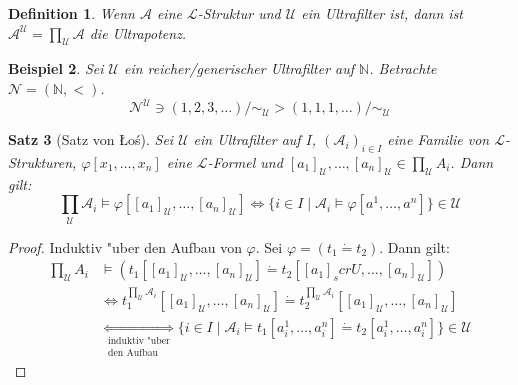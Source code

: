 \documentclass[a4paper,12pt,numbers=noenddot,parskip=full]{scrartcl}
\newcommand{\setN}{\mathbb{N}}
\newcommand{\scrL}{\mathcal{L}}
\newcommand{\scrA}{\mathcal{A}}
\newcommand{\scrU}{\mathcal{U}}
\theoremstyle{dotless}
\newtheorem{theorem}{Satz}[section]
\newtheorem{definition}[theorem]{Definition}
\newtheorem{example}[theorem]{Beispiel}
\theoremstyle{remark}
\begin{document}
	\begin{definition}
		Wenn $\scrA$ eine $\scrL$-Struktur und $\scrU$ ein Ultrafilter ist, dann ist $\scrA^\scrU = \prod\limits_{\scrU} \scrA$ die Ultrapotenz.
	\end{definition}

	\begin{example}
		Sei $\scrU$ ein reicher/generischer Ultrafilter auf $\setN$. Betrachte $\mathcal{N} = (\setN, <)$.
		\begin{equation*}
			\mathcal{N}^\scrU \ni {(1,2,3, \dots)/\sim_\scrU} > {(1,1,1, \dots)/ \sim_\scrU}
		\end{equation*}
	\end{example}

\begin{theorem}[Satz von Łoś]\label{los:thm}
	Sei $\scrU$ ein Ultrafilter auf $I$, $(\scrA_i)_{i \in I}$ eine Familie von $\scrL$-Strukturen, $\varphi[x_1, \dots, x_n]$ eine $\scrL$-Formel und $[a_1]_\scrU , \dots, [a_n]_\scrU \in \prod\limits_{\scrU} A_i$. Dann gilt:
	\begin{equation*}
		\prod\limits_{\scrU} \scrA_i \models \varphi[[a_1]_\scrU , \dots , [a_n]_\scrU] \Longleftrightarrow \{i \in I \mid \scrA_i \models \varphi[a^1, \dots, a^n] \} \in \scrU
	\end{equation*}
\end{theorem}
\begin{proof}
	Induktiv "uber den Aufbau von $\varphi$. Sei $\varphi = (t_1 \dot= t_2)$. Dann gilt:
	\begin{align*}
		\prod\limits_{\scrU} A_i &\models (t_1[[a_1]_\scrU , \dots, [a_n]_\scrU] \dot= t_2[[a_1]_scrU, \dots, [a_n]_\scrU])\\
		&\Leftrightarrow t_1^{\prod\limits_{\scrU} \scrA_i}[[a_1]_\scrU , \dots, [a_n]_\scrU] \dot= t_2^{\prod\limits_{\scrU} \scrA_i}[[a_1]_\scrU, \dots, [a_n]_\scrU]\\
		&\underset{\substack{\text{induktiv "uber}\\ \text{den Aufbau}}}{\Leftrightarrow} \{i \in I \mid \scrA_i \models t_1[a_i^1, \dots, a_i^n]\dot= t_2 [a_i^1, \dots, a_i^n] \} \in \scrU
	\end{align*}
\end{proof}
\end{document}
